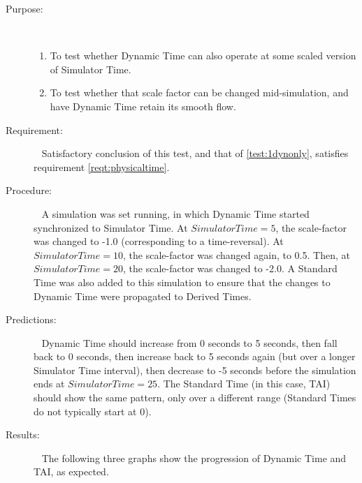  
 
 
\label{test:sim2scalefactor}
\begin{description}
\item[Purpose:]\ \newline
\begin{enumerate}
	\item To test whether Dynamic Time can also operate at some scaled 
	version of Simulator Time.
	\item To test whether that scale factor can be changed mid-simulation, 
	and have Dynamic Time retain its smooth flow.
\end{enumerate}

\item[Requirement:]\ \newline
Satisfactory conclusion of this test, and that of \ref{test:1dynonly}, 
satisfies requirement \ref{reqt:physicaltime}.

\item[Procedure:]\ \newline
A simulation was set running, in which Dynamic Time started synchronized to 
Simulator Time.  At $Simulator Time = 5$, the scale-factor was changed to -1.0 
(corresponding to a time-reversal).  At $Simulator Time = 10$, the scale-factor 
was changed again, to 0.5.  Then, at $Simulator Time = 20$, the scale-factor 
was changed to -2.0.
A Standard Time was also added to this simulation to ensure that the changes to 
Dynamic Time were propagated to Derived Times.

\item[Predictions:]\ \newline
Dynamic Time should increase from 0 seconds to 5 seconds, then fall back to 0
seconds, then increase back to 5 seconds again (but over a longer Simulator Time
interval), then decrease to -5 seconds before the simulation ends at $Simulator 
Time = 25$.  The Standard Time (in this case, TAI) should show the same 
pattern, only over a different range (Standard Times do not typically start at 
0).

\item[Results:]\ \newline
The following three graphs show the progression of Dynamic Time and TAI, as 
expected.


\end{description}
